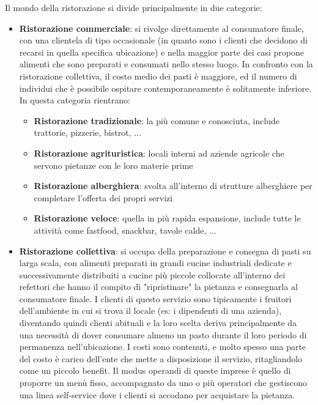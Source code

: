 \documentclass[a4paper, titlepage, 12pt, openright, twoside]{book}
\begin{document}
Il mondo della ristorazione si divide principalmente in due categorie:
\begin{itemize}
	\item \textbf{Ristorazione commerciale}: si rivolge direttamente al consumatore finale, con una clientela di tipo occasionale
											 (in quanto sono i clienti che decidono di recarsi in quella specifica ubicazione) e nella maggior parte dei casi
											 propone alimenti che sono preparati e consumati nello stesso luogo. In confronto con la ristorazione collettiva,
											 il costo medio dei pasti è maggiore, ed il numero di individui che è possibile ospitare contemporaneamente è solitamente inferiore.
											 In questa categoria rientrano:
											 \begin{itemize}
											 	\item \textbf{Ristorazione tradizionale}: la più comune e conosciuta, include trattorie, pizzerie, bistrot, ...
											 	\item \textbf{Ristorazione agrituristica}: locali interni ad aziende agricole che servono pietanze con le loro materie prime
											 	\item \textbf{Ristorazione alberghiera}: svolta all'interno di strutture alberghiere per completare l'offerta dei propri servizi
											 	\item \textbf{Ristorazione veloce}: quella in più rapida espansione, include tutte le attività 
											 										come fastfood, snackbar, tavole calde, ...
											 \end{itemize}
	\item \textbf{Ristorazione collettiva}: si occupa della preparazione e consegna di pasti su larga scala, con alimenti preparati in grandi cucine industriali dedicate e
											successivamente distribuiti a cucine più piccole collocate all'interno dei refettori che hanno il compito di "ripristinare" la pietanza
											e consegnarla al consumatore finale. I clienti di questo servizio sono tipicamente i fruitori dell'ambiente in cui si trova il locale
											(es: i dipendenti di una azienda), diventando quindi clienti abituali e la loro scelta deriva principalmente 
											da una necessità di dover consumare almeno un pasto durante il loro periodo di permanenza nell'ubicazione. 
											I costi sono contenuti, e molto spesso una parte del costo è carico dell'ente che mette a disposizione
											il servizio, ritagliandolo come un piccolo benefit. Il modus operandi di queste imprese è quello di proporre un menù fisso,
											accompagnato da uno o più operatori che gestiscono una linea self-service dove i clienti si accodano per acquistare la pietanza.

\end{itemize}
\end{document}
